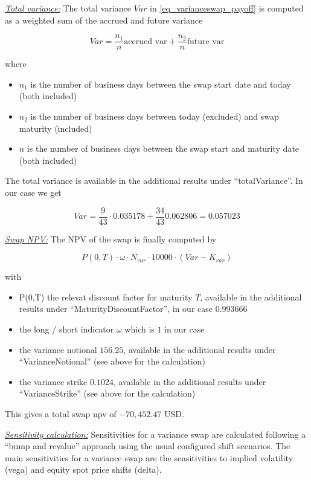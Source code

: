 \bigskip

\underline{\emph{Total variance:}} The total variance $Var$ in \ref{eq_varianceswap_payoff} is computed as a weighted sum
of the accrued and future variance

$$
Var = \frac{n_1}{n} \text{accrued var} + \frac{n_2}{n} \text{future var}
$$

where

\begin{itemize}
\item $n_1$ is the number of business days between the swap start date and today (both included)
\item $n_2$ is the number of business days between today (excluded) and swap maturity (included)
\item $n$ is the number of business days between the swap start and maturity date (both included)
\end{itemize}

The total variance is available in the additional results under ``totalVariance''. In our case we get

$$
Var = \frac{9}{43}\cdot 0.035178 + \frac{34}{43} 0.062806  = 0.057023
$$

\bigskip

\underline{\emph{Swap NPV:}} The NPV of the swap is finally computed by 

$$
P(0,T) \cdot \omega \cdot N_{var} \cdot 10000 \cdot ( Var - K_{var}  )
$$

with

\begin{itemize}
\item P(0,T) the relevat discount factor for maturity $T$, available in the additional results under ``MaturityDiscountFactor'', in our case $0.993666$
\item the long / short indicator $\omega$ which is $1$ in our case
\item the variance notional $156.25$, available in the additional results under ``VarianceNotional'' (see above for the calculation)
\item the variance strike $0.1024$, available in the additional results under ``VarianceStrike'' (see above for the calculation)
\end{itemize}

This gives a total swap npv of $-70,452.47$ USD.

\bigskip

\underline{\emph{Sensitivity calculation:}} Sensitivities for a variance swap are calculated following a ``bump and
revalue'' approach using the usual configured shift scenarios. The main sensitivities for a variance swap are the
sensitivities to implied volatility (vega) and equity spot price shifts (delta).

